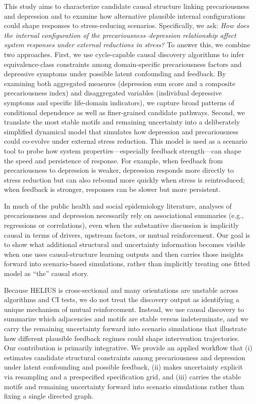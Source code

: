 \documentclass[
]{article}
\begin{document}
This study aims to characterize candidate causal structure linking
precariousness and depression and to examine how alternative plausible
internal configurations could shape responses to stress-reducing
scenarios. Specifically, we ask:
\textit{How does the internal configuration of the precariousness–depression relationship affect system responses under external reductions in stress?}
To answer this, we combine two approaches. First, we use cycle-capable
causal discovery algorithms to infer equivalence-class constraints among
domain-specific precariousness factors and depressive symptoms under
possible latent confounding and feedback. By examining both aggregated
measures (depression sum score and a composite precariousness index) and
disaggregated variables (individual depressive symptoms and specific
life-domain indicators), we capture broad patterns of conditional
dependence as well as finer-grained candidate pathways. Second, we
translate the most stable motifs and remaining uncertainty into a
deliberately simplified dynamical model that simulates how depression
and precariousness could co-evolve under external stress reduction. This
model is used as a scenario tool to probe how system
properties---especially feedback strength---can shape the speed and
persistence of response. For example, when feedback from precariousness
to depression is weaker, depression responds more directly to stress
reduction but can also rebound more quickly when stress is reintroduced;
when feedback is stronger, responses can be slower but more persistent.

In much of the public health and social epidemiology literature,
analyses of precariousness and depression necessarily rely on
associational summaries (e.g., regressions or correlations), even when
the substantive discussion is implicitly causal in terms of drivers,
upstream factors, or mutual reinforcement. Our goal is to show what
additional structural and uncertainty information becomes visible when
one uses causal-structure learning outputs and then carries those
insights forward into scenario-based simulations, rather than implicitly
treating one fitted model as ``the'' causal story.

Because HELIUS is cross-sectional and many orientations are unstable
across algorithms and CI tests, we do not treat the discovery output as
identifying a unique mechanism of mutual reinforcement. Instead, we use
causal discovery to summarize which adjacencies and motifs are stable
versus indeterminate, and we carry the remaining uncertainty forward
into scenario simulations that illustrate how different plausible
feedback regimes could shape intervention trajectories. Our contribution
is primarily integrative. We provide an applied workflow that (i)
estimates candidate structural constraints among precariousness and
depression under latent confounding and possible feedback, (ii) makes
uncertainty explicit via resampling and a prespecified specification
grid, and (iii) carries the stable motifs and remaining uncertainty
forward into scenario simulations rather than fixing a single directed
graph.
\end{document}
